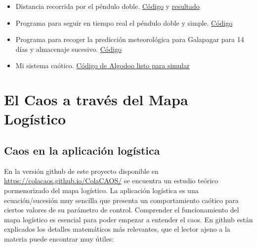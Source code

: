 \documentclass[
  10pt,
  a4paper,
  DIV=11,
  numbers=noendperiod,
  open=any]{scrreprt}
\numberwithin{equation}{chapter}
\numberwithin{equation}{section}
\renewcommand{\[}{\begin{equation}}
\renewcommand{\]}{\end{equation}}
\begin{document}
\begin{itemize}
\item
  Distancia recorrida por el péndulo doble.
  \href{https://github.com/ColaCaos/ColaCAOS/blob/master/pendulumDistance.py}{Código}
  y
  \href{https://colacaos.github.io/ColaCAOS/02-pendulo-doble/estadisticas.html}{resultado}
\item
  Programa para seguir en tiempo real el péndulo doble y simple.
  \href{https://github.com/ColaCaos/ColaCAOS/blob/master/python/Tracker/TrackerRuben.py}{Código}
\item
  Programa para recoger la predicción meteorológica para Galapagar para
  14 días y almacenaje sucesivo.
  \href{https://github.com/ColaCaos/ColaCAOS/blob/master/meteoblue/DailyScript.py}{Código}
\item
  Mi sistema caótico.
  \href{https://colacaos.github.io/ColaCAOS/05-experimentos/NuevaRuedaCaoticaSimetricaAnilloConSinCanicasAceroFuenteMejoradaMasAgua_Transfer_Estadio_Inicial_0.phz}{Código
  de Algodoo listo para simular}
\end{itemize}


\part{El Caos a través del Mapa Logístico}


\chapter{Caos en la aplicación logística}\label{caos}

En la versión github de este proyecto disponible en \href{https://colacaos.github.io/ColaCAOS/}{https://colacaos.github.io/ColaCAOS/} se encuentra un estudio teórico pormenorizado del mapa logístico. La aplicación logística es una ecuación/sucesión muy sencilla que presenta un comportamiento caótico para ciertos valores de su parámetro de control. Comprender el funcionamiento del mapa logístico es esencial para poder empezar a entender el caos. En github están explicados los detalles matemáticos más relevantes, que el lector ajeno a la materia puede encontrar muy útiles:
\end{document}
